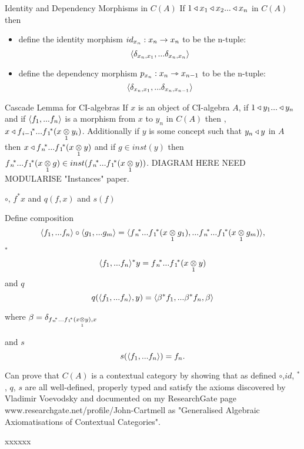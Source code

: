 \begin{frame}{Identity and Dependency Morphisms in $C(A)$}
If $1 \base x_1 \base x_2 ... \base x_n$ in $C(A)$
then 
\begin{itemize}
\item define the identity morphism $id_{x_n}:x_n \morph x_n$  
to be the n-tuple:
$$\tuple{\delta_{x_n,x_1},...\delta_{x_n,x_n}}$$
\item define the dependency morphism $p_{x_n}:x_n \smorph x_{n-1}$ to be the n-tuple:
$$\tuple{\delta_{x_n,x_1},...\delta_{x_n,x_{n-1}}}$$
\end{itemize}
\end{frame}

\begin{frame}{Cascade Lemma for CI-algebras }
If $x$ is an object of CI-algebra $A$, if $1 \base y_1 ... \base y_n$ and 
if $\tuple{f_1,...f_n}$ is a morphism from $x$ to $y_n$ in $C(A)$ then \foreachi, $x \base \fipvectorstar(\crossx{x}{y_i}{1})$.
Additionally if $y$ is some concept such that $y_n \base y$ in $A$ then 
 $x \base \fnvectorstar(\crossx{x}{y}{1})$  and
if $g \in inst(y)$ 
then $\fnvectorstar(\crossx{x}{g}{1}) \in inst(\fnvectorstar(\crossx{x}{y}{1}))$.
DIAGRAM HERE NEED MODULARISE "Instances" paper.
\end{frame}

\iffalse{
\begin{frame}{Composition of morphisms}
Composition of morphisms is defined as follows.

$$\tuple{f_1,...f_n}\circ \tuple{g_1,...g_m} 
=\tuple{\fnvectorstar(\crossx{x}{g_1}{1}),...\fnvectorstar(\crossx{x}{g_m}{1})}
$$
\end{frame}
}\fi

\begin{frame}{$\circ$, $f^*x$ and $q(f,x)$ and $s(f)$}
\newcommand{\pullbackobject}{\fnvectorstar(\crossx{x}{y}{1})}
\newcommand{\deltaterm}{\delta_{\pullbackobject,x}}

Define composition
\begin{equation} 
\tuple{f_1,...f_n}\circ \tuple{g_1,...g_m} 
=\tuple{\fnvectorstar(\crossx{x}{g_1}{1}),...\fnvectorstar(\crossx{x}{g_m}{1})},
\end{equation}
$^*$ 
\begin{equation} 
\tuple{\fn}^*y=\pullbackobject
\end{equation}
and $q$ 
\begin{equation} 
q(\tuple{\fn},y)=
\tuple{{\beta}^*f_1,...{\beta}^*f_n,\beta}
\end{equation}

where 
$\beta = \deltaterm$

and $s$ 
\begin{equation} 
s(\tuple{\fn})=f_n.
\end{equation}

Can prove that $C(A)$ is a contextual category by showing that as defined
$\circ$,$id$, $^*$, $q$, $s$ are all well-defined, properly typed and satisfy the axioms discovered by Vladimir Voevodsky and documented on my ResearchGate page
www.researchgate.net/profile/John-Cartmell
as 
"Generalised Algebraic Axiomatisations of Contextual Categories".
\end{frame}

\begin{frame}{xxxxxx}
\end{frame}



